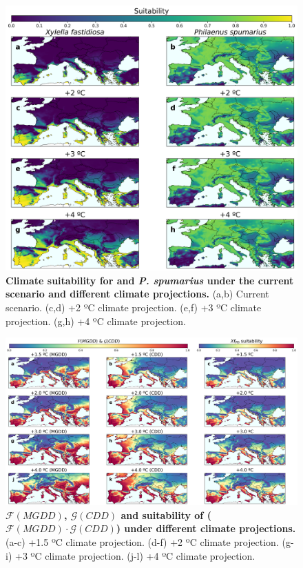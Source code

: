 \begin{figure}[H]
    \centering
    \includegraphics[width=\textwidth]{Figures/Xf_Ps_suitability.pdf}
    \caption{\textbf{Climate suitability for \xf{} and \textit{P.
                spumarius} under the current scenario and different climate
            projections.} (a,b)
        Current scenario. (c,d) +2 ºC climate projection. (e,f) +3 ºC climate
        projection. (g,h) +4 ºC climate projection.}
    \label{fig:Xf_Ps_suitability}
\end{figure}

\begin{figure}[H]
    \centering

    \includegraphics[width=\textwidth]{Figures/Xf_suitability_explainability.pdf}
    \caption{\textbf{$\mathcal{F}(MGDD)$, $\mathcal{G}(CDD)$ and
            suitability of \xf{} ($\mathcal{F}(MGDD)\cdot\mathcal{G}(CDD)$)
            under different
            climate projections.} (a-c) +1.5 ºC climate projection. (d-f) +2 ºC
        climate
        projection. (g-i) +3 ºC climate projection. (j-l) +4 ºC climate
        projection.}
    \label{fig:Xf_suitability_explainability}
\end{figure}

